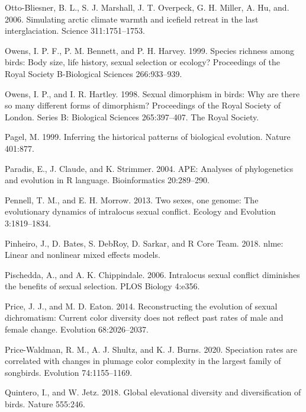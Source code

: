 \documentclass[]{article}
\begin{document}
\leavevmode\hypertarget{ref-Otto-Bliesner_2006}{}%
Otto-Bliesner, B. L., S. J. Marshall, J. T. Overpeck, G. H. Miller, A.
Hu, and. 2006. Simulating arctic climate warmth and icefield retreat in
the last interglaciation. Science 311:1751--1753.

\leavevmode\hypertarget{ref-Owens_1999}{}%
Owens, I. P. F., P. M. Bennett, and P. H. Harvey. 1999. Species richness
among birds: Body size, life history, sexual selection or ecology?
Proceedings of the Royal Society B-Biological Sciences 266:933--939.

\leavevmode\hypertarget{ref-owens_1998}{}%
Owens, I. P., and I. R. Hartley. 1998. Sexual dimorphism in birds: Why
are there so many different forms of dimorphism? Proceedings of the
Royal Society of London. Series B: Biological Sciences 265:397--407. The
Royal Society.

\leavevmode\hypertarget{ref-Pagel_1999}{}%
Pagel, M. 1999. Inferring the historical patterns of biological
evolution. Nature 401:877.

\leavevmode\hypertarget{ref-ape_2004}{}%
Paradis, E., J. Claude, and K. Strimmer. 2004. APE: Analyses of
phylogenetics and evolution in R language. Bioinformatics 20:289--290.

\leavevmode\hypertarget{ref-Pennell_2013}{}%
Pennell, T. M., and E. H. Morrow. 2013. Two sexes, one genome: The
evolutionary dynamics of intralocus sexual conflict. Ecology and
Evolution 3:1819--1834.

\leavevmode\hypertarget{ref-nlme_2018}{}%
Pinheiro, J., D. Bates, S. DebRoy, D. Sarkar, and R Core Team. 2018.
nlme: Linear and nonlinear mixed effects models.

\leavevmode\hypertarget{ref-Pischedda_2006}{}%
Pischedda, A., and A. K. Chippindale. 2006. Intralocus sexual conflict
diminishes the benefits of sexual selection. PLOS Biology 4:e356.

\leavevmode\hypertarget{ref-Price_2014}{}%
Price, J. J., and M. D. Eaton. 2014. Reconstructing the evolution of
sexual dichromatism: Current color diversity does not reflect past rates
of male and female change. Evolution 68:2026--2037.

\leavevmode\hypertarget{ref-Price-Waldman_2020}{}%
Price-Waldman, R. M., A. J. Shultz, and K. J. Burns. 2020. Speciation
rates are correlated with changes in plumage color complexity in the
largest family of songbirds. Evolution 74:1155--1169.

\leavevmode\hypertarget{ref-quintero_2018}{}%
Quintero, I., and W. Jetz. 2018. Global elevational diversity and
diversification of birds. Nature 555:246.
\end{document}
